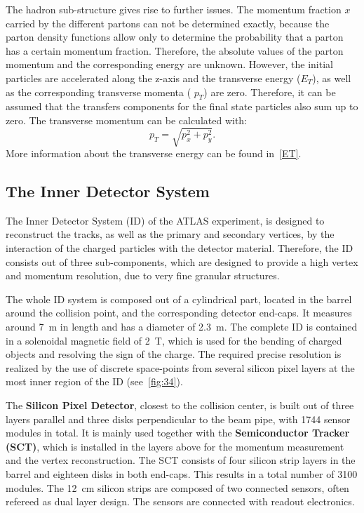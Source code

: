 The hadron sub-structure gives rise to further issues. The momentum fraction $x$ carried by the different partons can not be determined exactly, because the parton density functions allow only to determine the probability that a parton has a certain momentum fraction. Therefore, the absolute values of the parton momentum and the corresponding energy are unknown. 
However, the initial particles are accelerated along the z-axis and the transverse energy ($E_T$), as well as the corresponding transverse momenta ( $p_T$) are zero.
Therefore, it can be  assumed that the transfers components for the final state particles also sum up to zero.  The transverse momentum can be calculated with: 
 \begin{equation}
 p_T = \sqrt{p_x^2+p_y^2}.
 \end{equation}  
 More information about the transverse energy can be found in~\cref{ET}.        





\subsection{The Inner Detector System}\label{ID}
The Inner Detector System (ID) of the ATLAS experiment, is designed to reconstruct the tracks, as well as the primary and secondary vertices, by the interaction of the charged particles with the detector material. Therefore, the ID consists out of three sub-components, which are designed to provide a high vertex and momentum resolution, due to  very fine granular structures.

The whole ID system is composed out of a cylindrical part, located in the barrel around the collision point, and the corresponding detector end-caps. It measures around 7~m in length and has a diameter of 2.3~m. The complete ID is contained in a solenoidal magnetic field of 2~T, which is used for the bending of charged objects and resolving the sign of the charge. The required precise resolution is realized by the use of discrete space-points from several silicon pixel layers at the most inner region of the ID (see~\cref{fig:34}).

 The \textbf{Silicon Pixel Detector}, closest to the collision center, is built out of three layers parallel and three disks perpendicular to the beam pipe, with 1744 sensor modules in total. It is mainly used together with the \textbf{Semiconductor Tracker (SCT)}, which is installed in the layers above for the momentum measurement and the vertex reconstruction. The SCT consists of four silicon strip layers in the barrel and  eighteen disks in both end-caps. This results in a total number of 3100 modules. The 12~cm silicon strips are composed of two connected sensors, often refereed as dual layer design. The sensors are connected with readout electronics.

